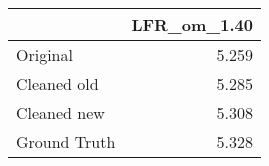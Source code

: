 \begin{tabular}{lr}
\toprule
{} & LFR_om_1.40 \\
\midrule
Original     &       5.259 \\
Cleaned old  &       5.285 \\
Cleaned new  &       5.308 \\
Ground Truth &       5.328 \\
\bottomrule
\end{tabular}
